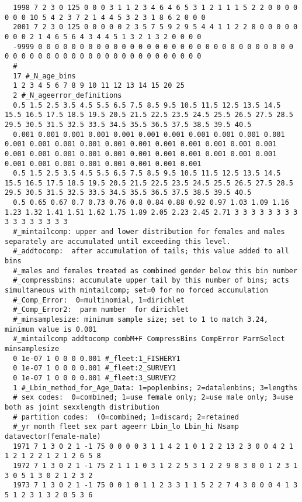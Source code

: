 \begin{landscape}
{\begin{verbatim}
  1998 7 2 3 0 125 0 0 0 3 1 1 2 3 4 6 4 6 5 3 1 2 1 1 1 5 2 2 0 0 0 0 0 0 0 10 5 4 2 3 7 2 1 4 4 5 3 2 3 1 8 6 2 0 0 0
  2001 7 2 3 0 125 0 0 0 0 0 2 3 5 7 5 9 2 9 5 4 4 1 1 2 2 8 0 0 0 0 0 0 0 0 2 1 4 6 5 6 4 3 4 4 5 1 3 2 1 3 2 0 0 0 0
  -9999 0 0 0 0 0 0 0 0 0 0 0 0 0 0 0 0 0 0 0 0 0 0 0 0 0 0 0 0 0 0 0 0 0 0 0 0 0 0 0 0 0 0 0 0 0 0 0 0 0 0 0 0 0 0 0 
  #
  17 #_N_age_bins
  1 2 3 4 5 6 7 8 9 10 11 12 13 14 15 20 25
  2 #_N_ageerror_definitions
  0.5 1.5 2.5 3.5 4.5 5.5 6.5 7.5 8.5 9.5 10.5 11.5 12.5 13.5 14.5 15.5 16.5 17.5 18.5 19.5 20.5 21.5 22.5 23.5 24.5 25.5 26.5 27.5 28.5 29.5 30.5 31.5 32.5 33.5 34.5 35.5 36.5 37.5 38.5 39.5 40.5
  0.001 0.001 0.001 0.001 0.001 0.001 0.001 0.001 0.001 0.001 0.001 0.001 0.001 0.001 0.001 0.001 0.001 0.001 0.001 0.001 0.001 0.001 0.001 0.001 0.001 0.001 0.001 0.001 0.001 0.001 0.001 0.001 0.001 0.001 0.001 0.001 0.001 0.001 0.001 0.001 0.001
  0.5 1.5 2.5 3.5 4.5 5.5 6.5 7.5 8.5 9.5 10.5 11.5 12.5 13.5 14.5 15.5 16.5 17.5 18.5 19.5 20.5 21.5 22.5 23.5 24.5 25.5 26.5 27.5 28.5 29.5 30.5 31.5 32.5 33.5 34.5 35.5 36.5 37.5 38.5 39.5 40.5
  0.5 0.65 0.67 0.7 0.73 0.76 0.8 0.84 0.88 0.92 0.97 1.03 1.09 1.16 1.23 1.32 1.41 1.51 1.62 1.75 1.89 2.05 2.23 2.45 2.71 3 3 3 3 3 3 3 3 3 3 3 3 3 3 3 3
  #_mintailcomp: upper and lower distribution for females and males separately are accumulated until exceeding this level.
  #_addtocomp:  after accumulation of tails; this value added to all bins
  #_males and females treated as combined gender below this bin number 
  #_compressbins: accumulate upper tail by this number of bins; acts simultaneous with mintailcomp; set=0 for no forced accumulation
  #_Comp_Error:  0=multinomial, 1=dirichlet
  #_Comp_Error2:  parm number  for dirichlet
  #_minsamplesize: minimum sample size; set to 1 to match 3.24, minimum value is 0.001
  #_mintailcomp addtocomp combM+F CompressBins CompError ParmSelect minsamplesize
  0 1e-07 1 0 0 0 0.001 #_fleet:1_FISHERY1
  0 1e-07 1 0 0 0 0.001 #_fleet:2_SURVEY1
  0 1e-07 1 0 0 0 0.001 #_fleet:3_SURVEY2
  1 #_Lbin_method_for_Age_Data: 1=poplenbins; 2=datalenbins; 3=lengths
  # sex codes:  0=combined; 1=use female only; 2=use male only; 3=use both as joint sexxlength distribution
  # partition codes:  (0=combined; 1=discard; 2=retained
  #_yr month fleet sex part ageerr Lbin_lo Lbin_hi Nsamp datavector(female-male)
  1971 7 1 3 0 2 1 -1 75 0 0 0 0 3 1 1 4 2 1 0 1 2 2 13 2 3 0 0 4 2 1 1 2 1 2 2 1 2 1 2 6 5 8
  1972 7 1 3 0 2 1 -1 75 2 1 1 1 0 3 1 2 2 5 3 1 2 2 9 8 3 0 0 1 2 3 1 3 0 5 1 3 0 2 1 2 3 2
  1973 7 1 3 0 2 1 -1 75 0 0 1 0 1 1 2 3 3 1 1 5 2 2 7 4 3 0 0 0 4 1 3 5 1 2 3 1 3 2 0 5 3 6

\end{verbatim}}
\end{landscape}
